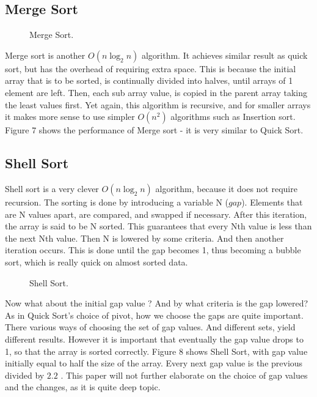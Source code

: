 \documentclass{acm_proc_article-sp}
\begin{document}
\subsection{Merge Sort}
\begin{figure}[!htb]
\caption{Merge Sort.}
\end{figure}
Merge sort is another  $O(n \log_2 n)$ algorithm. It achieves similar result as quick sort, but has the overhead of requiring extra space. This is because the initial array that is to be sorted, is continually divided into halves, until arrays of 1 element are left. Then, each sub array value, is copied in the parent array taking the least values first. Yet again, this algorithm is recursive, and for smaller arrays it makes more sense to use simpler $O(n^2)$ algorithms such as Insertion sort. Figure 7 shows the performance of Merge sort - it is very similar to Quick Sort.\\

\subsection{Shell Sort}
Shell sort is a very clever $O(n \log_2 n)$ algorithm, because it does not require recursion. The sorting is done by introducing a variable N ($gap$). Elements that are N values apart, are compared, and swapped if necessary. After this iteration, the array is said to be N sorted. This guarantees that every Nth value is less than the next Nth value.
Then N is lowered by some criteria. And then another iteration occurs. This is done until the gap becomes 1, thus becoming a bubble sort, which is really quick on almost sorted data. 
\begin{figure}[!htb]
\caption{Shell Sort.}
\end{figure}
Now what about the initial gap value ? And by what criteria is the gap lowered? As in Quick Sort's choice of pivot, how we choose the gaps are quite important. There various ways of choosing the set of gap values. And different sets, yield different results. However it is important that eventually the gap value drops to 1, so that the array is sorted correctly.  Figure 8 shows Shell Sort, with gap value initially equal to half the size of the array. Every next gap value is the previous divided by $2.2$ . This paper will not further elaborate on the choice of gap values and the changes, as it is quite deep topic.
\end{document}
